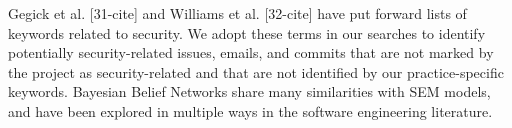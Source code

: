 Gegick et al. [31-cite] and Williams et al. [32-cite] have put forward lists of keywords related to security. We adopt these terms in our searches to identify potentially security-related issues, emails, and commits that are not marked by the project as security-related and that are not identified by our practice-specific keywords.
Bayesian Belief Networks share many similarities with SEM models, and have been explored in multiple ways in the software engineering literature. 

